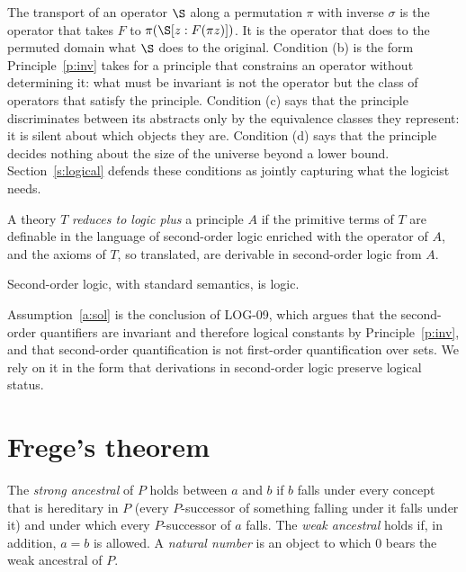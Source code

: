 \documentclass{situationist-preprint}
\begin{document}
The transport of an operator $\S$ along a permutation $\pi$ with inverse $\sigma$ is the operator that takes $F$ to $\pi(\S[z : F(\pi z)])$. It is the operator that does to the permuted domain what $\S$ does to the original. Condition (b) is the form Principle~\ref{p:inv} takes for a principle that constrains an operator without determining it: what must be invariant is not the operator but the class of operators that satisfy the principle. Condition (c) says that the principle discriminates between its abstracts only by the equivalence classes they represent: it is silent about which objects they are. Condition (d) says that the principle decides nothing about the size of the universe beyond a lower bound. Section~\ref{s:logical} defends these conditions as jointly capturing what the logicist needs.

\begin{definition}[Reduction]\label{d:red}
A theory $T$ \emph{reduces to logic plus} a principle $A$ if the primitive terms of $T$ are definable in the language of second-order logic enriched with the operator of $A$, and the axioms of $T$, so translated, are derivable in second-order logic from $A$.
\end{definition}

\begin{assumption}\label{a:sol}
Second-order logic, with standard semantics, is logic.
\end{assumption}

Assumption~\ref{a:sol} is the conclusion of LOG-09, which argues that the second-order quantifiers are invariant and therefore logical constants by Principle~\ref{p:inv}, and that second-order quantification is not first-order quantification over sets. We rely on it in the form that derivations in second-order logic preserve logical status.

\section{Frege's theorem}\label{s:frege}

\begin{definition}[Frege]\label{d:nat}
The \emph{strong ancestral} of $P$ holds between $a$ and $b$ if $b$ falls under every concept that is hereditary in $P$ (every $P$-successor of something falling under it falls under it) and under which every $P$-successor of $a$ falls. The \emph{weak ancestral} holds if, in addition, $a = b$ is allowed. A \emph{natural number} is an object to which $0$ bears the weak ancestral of $P$.
\end{definition}
\end{document}
